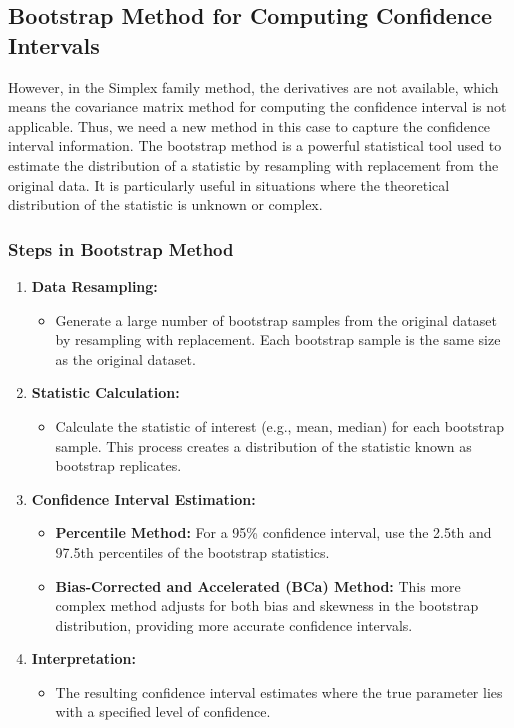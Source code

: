 \documentclass[12pt]{article} %
\begin{document}
\subsection{Bootstrap Method for Computing Confidence Intervals}

However, in the Simplex family method, the derivatives are not available, which means the covariance matrix method for computing the confidence interval is not applicable. Thus, we need a new method in this case to capture the confidence interval information. The bootstrap method is a powerful statistical tool used to estimate the distribution of a statistic by resampling with replacement from the original data. It is particularly useful in situations where the theoretical distribution of the statistic is unknown or complex.

\subsubsection{Steps in Bootstrap Method}

\begin{enumerate}
    \item \textbf{Data Resampling:}
    \begin{itemize}
        \item Generate a large number of bootstrap samples from the original dataset by resampling with replacement. Each bootstrap sample is the same size as the original dataset.
    \end{itemize}

    \item \textbf{Statistic Calculation:}
    \begin{itemize}
        \item Calculate the statistic of interest (e.g., mean, median) for each bootstrap sample. This process creates a distribution of the statistic known as bootstrap replicates.
    \end{itemize}

    \item \textbf{Confidence Interval Estimation:}
    \begin{itemize}
        \item \textbf{Percentile Method:} For a 95\% confidence interval, use the 2.5th and 97.5th percentiles of the bootstrap statistics.
        \item \textbf{Bias-Corrected and Accelerated (BCa) Method:} This more complex method adjusts for both bias and skewness in the bootstrap distribution, providing more accurate confidence intervals.
    \end{itemize}

    \item \textbf{Interpretation:}
    \begin{itemize}
        \item The resulting confidence interval estimates where the true parameter lies with a specified level of confidence.
    \end{itemize}
\end{enumerate}
\end{document}
